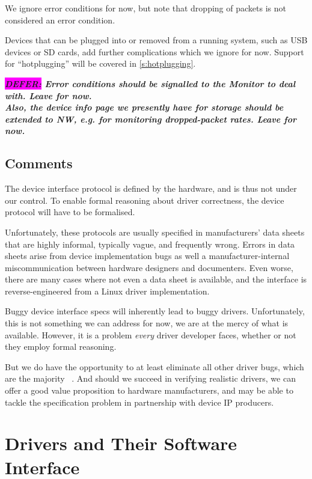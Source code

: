\documentclass[a4paper,12pt]{report}
\newcommand{\DEFER}[1]{\textbf{\textsl{\colorbox{magenta}{DEFER:} #1}}}
\newcommand{\DEFER}[1]{\relax}
\begin{document}
We ignore error conditions for now, but note that dropping of packets
is not considered an error condition.

Devices that can be plugged into or removed from a running system,
such as USB devices or SD cards, add further complications which we
ignore for now. Support for ``hotplugging'' will be covered in
\autoref{s:hotplugging}.

\DEFER{Error conditions should be signalled to the Monitor to deal
  with. Leave for now.\\
  Also, the device info page we presently have for storage should be
  extended to NW, e.g. for monitoring dropped-packet rates. Leave for now.}

\section{Comments}

The device interface protocol is defined by the hardware, and is thus not
under our control. To enable formal reasoning about driver
correctness, the device protocol will have to be formalised.

Unfortunately, these protocols are usually specified in manufacturers'
data sheets that are highly informal, typically vague, and frequently
wrong. Errors in data sheets arise from device implementation bugs as
well a manufacturer-internal miscommunication between hardware
designers and documenters. Even worse, there are many cases where not
even a data sheet is available, and the interface is
reverse-engineered from a Linux driver implementation.

Buggy device interface specs will inherently lead to buggy
drivers. Unfortunately, this is not something we can address for now,
we are at the mercy of what is available. However, it is a problem \emph{every}
driver developer faces, whether or not they employ formal reasoning.

But we do have the opportunity to at least eliminate all other driver
bugs, which are the majority ~\citep{Ryzhyk_CKH_09}. And should we
succeed in verifying realistic drivers, we can offer a good value
proposition to hardware manufacturers, and may be able to tackle the
specification problem in partnership with device IP producers.

\chapter{Drivers and Their Software Interface}\label{s:driver}
\end{document}
